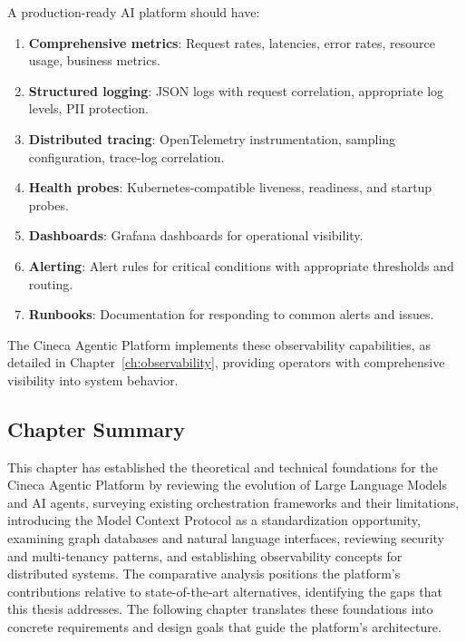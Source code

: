 \documentclass[a4paper,twoside]{sapthesis}
\begin{document}
A production-ready AI platform should have:

\begin{enumerate}
    \item \textbf{Comprehensive metrics}: Request rates, latencies, error rates, resource usage, business metrics.
    
    \item \textbf{Structured logging}: JSON logs with request correlation, appropriate log levels, PII protection.
    
    \item \textbf{Distributed tracing}: OpenTelemetry instrumentation, sampling configuration, trace-log correlation.
    
    \item \textbf{Health probes}: Kubernetes-compatible liveness, readiness, and startup probes.
    
    \item \textbf{Dashboards}: Grafana dashboards for operational visibility.
    
    \item \textbf{Alerting}: Alert rules for critical conditions with appropriate thresholds and routing.
    
    \item \textbf{Runbooks}: Documentation for responding to common alerts and issues.
\end{enumerate}

The Cineca Agentic Platform implements these observability capabilities, as detailed in Chapter~\ref{ch:observability}, providing operators with comprehensive visibility into system behavior.

\subsection{Chapter Summary}

This chapter has established the theoretical and technical foundations for the Cineca Agentic Platform by reviewing the evolution of Large Language Models and AI agents, surveying existing orchestration frameworks and their limitations, introducing the Model Context Protocol as a standardization opportunity, examining graph databases and natural language interfaces, reviewing security and multi-tenancy patterns, and establishing observability concepts for distributed systems. The comparative analysis positions the platform's contributions relative to state-of-the-art alternatives, identifying the gaps that this thesis addresses. The following chapter translates these foundations into concrete requirements and design goals that guide the platform's architecture.
\end{document}

